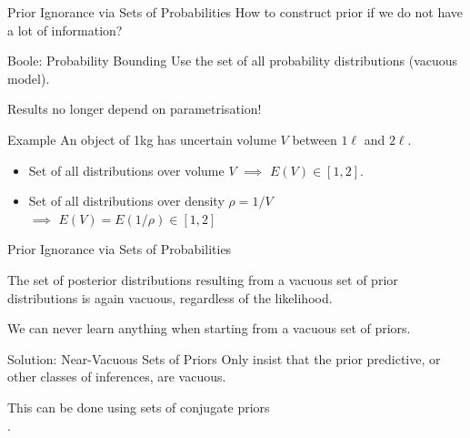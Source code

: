 \documentclass{beamer}
\begin{document}
\begin{frame}{Prior Ignorance via Sets of Probabilities}
   How to construct prior if we do not have a lot of information?
  \begin{alertblock}{Boole: Probability Bounding}
    Use the set of all probability distributions (\alert{vacuous model}).
  \end{alertblock}
  Results no longer depend on parametrisation!
  \begin{exampleblock}{Example}
    An object of 1kg has uncertain volume $V$ between $1\ell$ and $2\ell$.
    \begin{itemize}
    \item Set of all distributions over volume $V$ $\implies$ $E(V)\in[1,2]$.
    \item Set of all distributions over density $\rho=1/V$\\
      \hspace*{31ex} $\implies$ $E(V)=E(1/\rho)\in[1,2]$
    \end{itemize}
  \end{exampleblock}
\end{frame}

\begin{frame}{Prior Ignorance via Sets of Probabilities}
  \begin{theorem}
    The set of posterior distributions
    resulting from a vacuous set of prior distributions
    is again vacuous,
    regardless of the likelihood.
  \end{theorem}
  \alert{We can never learn anything when starting from a vacuous set of priors.}
  \pause
  \begin{alertblock}{Solution: Near-Vacuous Sets of Priors}
    Only insist that the prior predictive, or other classes of inferences, are vacuous.
  \end{alertblock}
  This can be done using sets of conjugate priors\\ \parencite{2012:benavolizaffalon,2015:benavolizaffalon}.
\end{frame}
\end{document}
